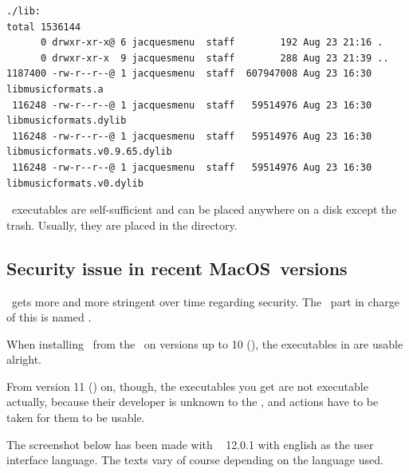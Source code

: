 \begin{lstlisting}[language=Terminal]
./lib:
total 1536144
      0 drwxr-xr-x@ 6 jacquesmenu  staff        192 Aug 23 21:16 .
      0 drwxr-xr-x  9 jacquesmenu  staff        288 Aug 23 21:39 ..
1187400 -rw-r--r--@ 1 jacquesmenu  staff  607947008 Aug 23 16:30 libmusicformats.a
 116248 -rw-r--r--@ 1 jacquesmenu  staff   59514976 Aug 23 16:30 libmusicformats.dylib
 116248 -rw-r--r--@ 1 jacquesmenu  staff   59514976 Aug 23 16:30 libmusicformats.v0.9.65.dylib
 116248 -rw-r--r--@ 1 jacquesmenu  staff   59514976 Aug 23 16:30 libmusicformats.v0.dylib
\end{lstlisting}

\MacOS\ executables are self-sufficient and can be placed anywhere on a disk except the trash. Usually, they are placed in the  directory.


\subsection{Security issue in recent MacOS\texttrademark\ versions}

\MacOS\ gets more and more stringent over time regarding security. The \OS\ part in charge of this is named \Gatekeeper.

When installing \mf\ from the \repo\ on versions up to 10 (), the executables in  are usable alright.

From version 11 () on, though, the executables you get are not executable actually, because their developer is unknown to the \OS, and actions have to be taken for them to be usable.

The screenshot below has been made with \MacOS\  12.0.1 with english as the user interface language. The texts vary of course depending on the language used.

